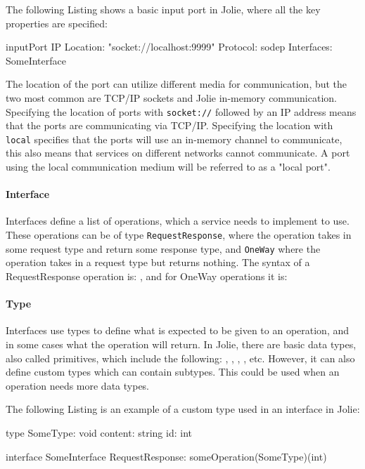 The following Listing shows a basic input port in Jolie, where all the key properties are specified:

\begin{jolisting}[][caption={
    },label=lst:simple-inputport]
inputPort IP {
    Location: "socket://localhost:9999"
    Protocol: sodep
    Interfaces: SomeInterface
}
\end{jolisting}

The location of the port can utilize different media for communication, but the two most common are TCP/IP sockets and Jolie in-memory communication.
Specifying the location of ports with \texttt{socket://} followed by an IP address means that the ports are communicating via TCP/IP.
Specifying the location with \texttt{local} specifies that the ports will use an in-memory channel to communicate, this also means that services on different networks cannot communicate.
A port using the local communication medium will be referred to as a "local port".

\paragraph{Interface} Interfaces define a list of operations, which a service needs to implement to use. These operations can be of type \texttt{RequestResponse}, where the operation takes in some request type and return some response type, 
and \texttt{OneWay} where the operation takes in a request type but returns nothing. The syntax of a RequestResponse operation is: , and for OneWay operations it is: 

\paragraph{Type} Interfaces use types to define what is expected to be given to an operation, and in some cases what the operation will return. In Jolie, there are basic
data types, also called primitives, which include the following: , , , , etc. However, it can also define custom types which can contain subtypes.
This could be used when an operation needs more data types.

The following Listing is an example of a custom type used in an interface in Jolie:
\begin{jolisting}[][caption={
    },label=lst:type-with-interf]
type SomeType: void {
    content: string
    id: int
}

interface SomeInterface {
    RequestResponse:
        someOperation(SomeType)(int)
}
\end{jolisting}

